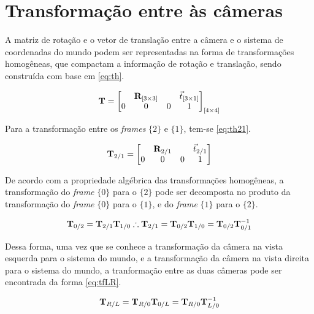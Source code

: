 \section{Transformação entre às câmeras}

A matriz de rotação e o vetor de translação entre a câmera e o sistema de coordenadas do mundo podem ser representadas na forma de transformações homogêneas, que compactam a informação de rotação e translação, sendo construída com base em \eqref{eq:th}.

\begin{equation}
	\mathbf{T} = \begin{bmatrix}
	&	\mathbf{R}_{[3\times 3]} & & \vec{t}_{[3\times 1]} \\
		0 & 0 & 0 & 1
	\end{bmatrix}_{[4\times 4]}
	\label{eq:th}
\end{equation}

Para a transformação entre os \textit{frames} $\{2\}$ e $\{1\}$, tem-se \eqref{eq:th21}.

\begin{equation}
\mathbf{T}_{2/1} = \begin{bmatrix}
	& \mathbf{R}_{2/1} & & \vec{t}_{2/1} \\
	0 & 0 & 0 & 1
\end{bmatrix}
\label{eq:th21}
\end{equation}

De acordo com a propriedade algébrica das transformações homogêneas, a transformação do \textit{frame} $\{0\}$ para o $\{2\}$ pode ser decomposta no produto da transformação do \textit{frame} $\{0\}$ para o $\{1\}$, e do   \textit{frame} $\{1\}$ para o $\{2\}$.

\begin{equation}
	\mathbf{T}_{0/2} = \mathbf{T}_{2/1} \mathbf{T}_{1/0} \therefore \mathbf{T}_{2/1} = \mathbf{T}_{0/2} \mathbf{T}_{1/0} = \mathbf{T}_{0/2} \mathbf{T}^{-1}_{0/1}
\end{equation}

Dessa forma, uma vez que se conhece a transformação da câmera na vista esquerda para o sistema do mundo, e a transformação da câmera na vista direita para o sistema do mundo, a tranformação entre as duas câmeras pode ser encontrada da forma \eqref{eq:tfLR}.

\begin{equation}
	\mathbf{T}_{R/L} = \mathbf{T}_{R/0}\mathbf{T}_{0/L} =  \mathbf{T}_{R/0}\mathbf{T}_{L/0}^{-1}
	\label{eq:tfLR}
\end{equation}




